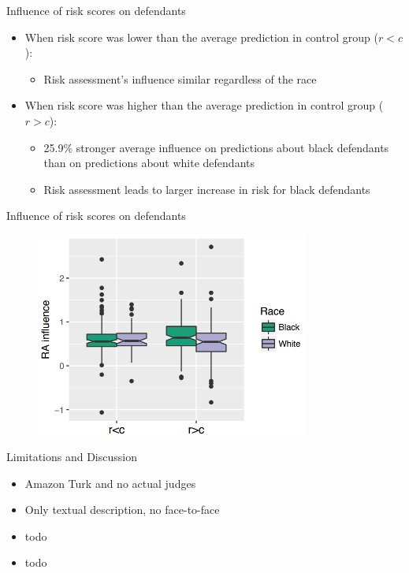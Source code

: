 \documentclass[11pt]{beamer}
\newcommand{\TODO}[1]{{\color{red}#1}}
\begin{document}
\begin{frame}{Influence of risk scores on defendants}
\begin{itemize}
\item When risk score was lower than the average prediction in control group ($r < c$):
\begin{itemize}
	\item Risk assessment's influence similar regardless of the race
\end{itemize}
\vspace{2pt}
\item When risk score was higher than the average prediction in control group ($r > c$):
\begin{itemize}
	\item 25.9\% stronger average influence on predictions about black defendants than on predictions about white defendants
	\item Risk assessment leads to larger increase in risk for black defendants
\end{itemize}
\end{itemize}
\end{frame}


\begin{frame}{Influence of risk scores on defendants}
\begin{figure}[t!]
	\centering
	\includegraphics[width=0.8\textwidth]{Figures/influence_of_risk_score.png}
\end{figure}
\end{frame}



\begin{frame}{Limitations and Discussion}
\begin{itemize}
	\item Amazon Turk and no actual judges
	\item Only textual description, no face-to-face
	
	\item \TODO{todo}
	\item \TODO{todo}
\end{itemize}
\end{frame}
\end{document}
